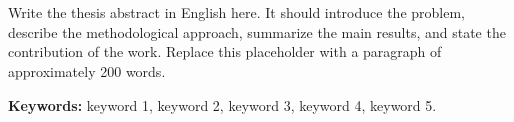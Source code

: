\chapter*{\runtitle}

\noindent Write the thesis abstract in English here. It should introduce the problem, describe the methodological approach, summarize the main results, and state the contribution of the work. Replace this placeholder with a paragraph of approximately 200 words.

\bigskip

\noindent\textbf{Keywords:} keyword 1, keyword 2, keyword 3, keyword 4, keyword 5.
